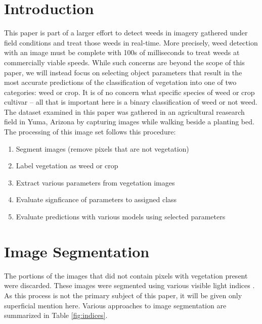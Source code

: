\documentclass[letterpaper]{article}
\begin{document}
\section{Introduction}
This paper is part of a larger effort to detect weeds in imagery gathered under field conditions and treat those weeds in real-time. More precisely, weed detection with an image must be complete with 100s of milliseconds to treat weeds at commercially viable speeds. While such concerns are beyond the scope of this paper, we will instead focus on selecting object parameters that result in the most accurate predictions of the classification of vegetation into one of two categories: weed or crop. It is of no concern what specific species of weed or crop cultivar -- all that is important here is a binary classification of weed or not weed.\\
The dataset examined in this paper was gathered in an agricultural reasearch field in Yuma, Arizona by capturing images while walking beside a planting bed. The processing of this image set follows this procedure:
\begin{enumerate}
	\item{Segment images (remove pixels that are not vegetation)}
	\item{Label vegetation as weed or crop}
	\item{Extract various parameters from  vegetation images}
	\item{Evaluate signficance of parameters to assigned class}
	\item{Evaluate predictions with various models using selected parameters}
\end{enumerate}

%
%
\section{Image Segmentation}
The portions of the images that did not contain pixels with vegetation present were discarded. These images were segmented using various visible light indices \cite{Wirth2004-li}. As this process is not the primary subject of this paper, it will be given only superficial mention here.  Various approaches to image segmentation are  summarized in Table \ref{fig:indices}.
\end{document}
